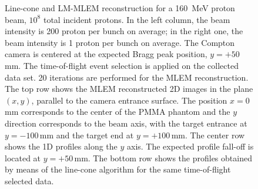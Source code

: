 \begin{figure}
\caption{Line-cone and LM-MLEM reconstruction for a 160~MeV proton beam, $10^{8}$ total incident protons. In the left column, the beam intensity is 200 proton per bunch on average; in the right one, the beam intensity is 1 proton per bunch on average. The Compton camera is centered at the expected Bragg peak position, $y=+50\,$mm. The time-of-flight event selection is applied on the collected data set. 20 iterations are performed for the MLEM reconstruction. The top row shows the MLEM reconstructed 2D images in the plane $(x,y)$, parallel to the camera entrance surface. The position $x=0\,$mm corresponds to the center of the PMMA phantom and the $y$ direction corresponds to the beam axis, with the target entrance at $y=-100\,$mm and the target end at $y=+100\,$mm.  The center row shows the 1D profiles along the $y$ axis. The expected profile fall-off is located at $y=+50\,$mm. The bottom row shows the profiles obtained by means of the line-cone algorithm for the same time-of-flight selected data.}
\label{fig:comparison}
\end{figure}





